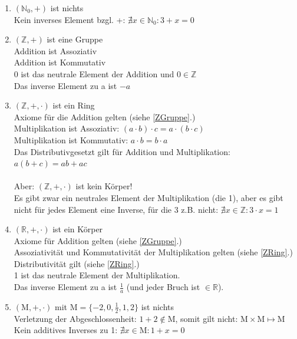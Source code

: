 \documentclass[11pt, a4paper]{article}
\begin{document}
\begin{enumerate}
	\item $\left( \mathbb{N}_0, + \right)$ ist nichts \\
	Kein inverses Element bzgl. +: $\nexists x \in \mathbb{N}_0: 3+x=0$
	\item $\left( \mathbb{Z}, + \right)$ ist eine Gruppe \label{ZGruppe} \\
	Addition ist Assoziativ \\
	Addition ist Kommutativ \\
	0 ist das neutrale Element der Addition und $0 \in \mathbb{Z}$ \\
	Das inverse Element zu a ist $-a$
	\item $\left( \mathbb{Z}, +, \cdot \right)$ ist ein Ring \label{ZRing} \\
	Axiome für die Addition gelten (siehe \ref{ZGruppe}.) \\
	Multiplikation ist Assoziativ: $(a \cdot b) \cdot c = a \cdot (b \cdot c)$ \\
	Multiplikation ist Kommutativ: $a \cdot b = b \cdot a$ \\
	Das Distributivgesetzt gilt für Addition und Multiplikation: $a(b+c) = ab + ac$ \\ \\
	Aber: $\left( \mathbb{Z}, +, \cdot \right)$ ist kein Körper! \\
	Es gibt zwar ein neutrales Element der Multiplikation (die 1), aber es gibt nicht für jedes Element eine Inverse, für die 3 z.B. nicht: $\nexists x \in \mathbb{Z}: 3\cdot x = 1$
	\item $\left( \mathbb{R}, +, \cdot \right)$ ist ein Körper \\
	Axiome für Addition gelten (siehe \ref{ZGruppe}.) \\
	Assoziativität und Kommutativität der Multiplikation gelten (siehe \ref{ZRing}.) \\
	Distributivität gilt (siehe \ref{ZRing}.) \\
	1 ist das neutrale Element der Multiplikation. \\
	Das inverse Element zu a ist $\frac{1}{a}$ (und jeder Bruch ist $\in \mathbb{R}$).
	\item $\left( \mathrm{M}, +, \cdot \right)$ mit $\mathrm{M} = \{ -2,0,\frac{1
	}{2},1,2 \}$ ist nichts \\
	Verletzung der Abgeschlossenheit: $1+2 \notin \mathrm{M}$, somit gilt nicht: $\mathrm{M} \times \mathrm{M} \mapsto \mathrm{M}$ \\
	Kein additives Inverses zu 1: $\nexists x \in \mathrm{M}: 1+x=0$ \\

\end{enumerate}
\end{document}

